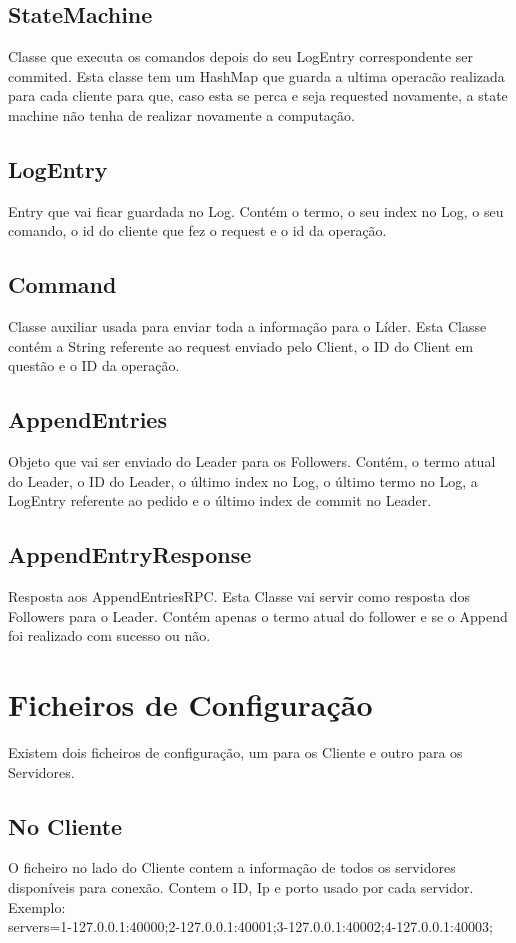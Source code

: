 \documentclass[12pt,a4paper]{report}
\begin{document}
\subsection{StateMachine}
Classe que executa os comandos depois do seu LogEntry correspondente ser commited. Esta classe tem um HashMap que guarda a ultima operacão realizada para cada cliente para que, caso esta se perca e seja requested novamente, a state machine não tenha de realizar novamente a computação.
\subsection{LogEntry}
Entry que vai ficar guardada no Log. Contém o termo, o seu index no Log, o seu comando, o id do cliente que fez o request e o id da operação.
\subsection{Command}
Classe auxiliar usada para enviar toda a informação para o Líder. Esta Classe contém a String referente ao request enviado pelo Client, o ID do Client em questão e o ID da operação.
\subsection{AppendEntries}
Objeto que vai ser enviado do Leader para os Followers. Contém, o termo atual do Leader, o ID do Leader, o último index no Log, o último termo no Log, a LogEntry referente ao pedido e o último index de commit no Leader.
\subsection{AppendEntryResponse}
Resposta aos AppendEntriesRPC. Esta Classe vai servir como resposta dos Followers para o Leader. Contém apenas o termo atual do follower e se o Append foi realizado com sucesso ou não.
\newpage
\section{Ficheiros de Configuração}
Existem dois ficheiros de configuração, um para os Cliente e outro para os Servidores.
\subsection{No Cliente}
O ficheiro no lado do Cliente contem a informação de todos os servidores disponíveis para conexão. Contem o ID, Ip e porto usado por cada servidor.\\
Exemplo: \\
servers=1-127.0.0.1:40000;2-127.0.0.1:40001;3-127.0.0.1:40002;4-127.0.0.1:40003;
\end{document}

